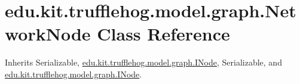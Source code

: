 \hypertarget{classedu_1_1kit_1_1trufflehog_1_1model_1_1graph_1_1_network_node}{}\section{edu.\+kit.\+trufflehog.\+model.\+graph.\+Network\+Node Class Reference}
\label{classedu_1_1kit_1_1trufflehog_1_1model_1_1graph_1_1_network_node}


Inherits Serializable, \hyperlink{interfaceedu_1_1kit_1_1trufflehog_1_1model_1_1graph_1_1_i_node}{edu.\+kit.\+trufflehog.\+model.\+graph.\+I\+Node}, Serializable, and \hyperlink{interfaceedu_1_1kit_1_1trufflehog_1_1model_1_1graph_1_1_i_node}{edu.\+kit.\+trufflehog.\+model.\+graph.\+I\+Node}.

